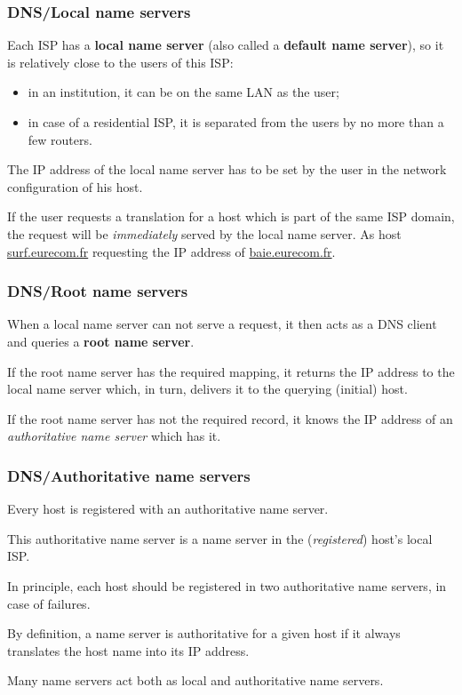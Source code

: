%
\begin{frame}
\frametitle{DNS/Local name servers}

Each ISP has a \textbf{local name server} (also called a
\textbf{default name server}), so it is relatively close to the users
of this ISP:
\begin{itemize}

  \item in an institution, it can be on the same LAN as the user;

  \item in case of a residential ISP, it is separated from the users
  by no more than a few routers.

\end{itemize}

The IP address of the local name server has to be set by the user in
the network configuration of his host.

If the user requests a translation for a host which is part of the
same ISP domain, the request will be \emph{immediately} served by the
local name server. As host \url{surf.eurecom.fr} requesting the IP
address of \url{baie.eurecom.fr}.

\end{frame}

%
\begin{frame}
\frametitle{DNS/Root name servers}

When a local name server can not serve a request, it then acts as a
DNS client and queries a \textbf{root name server}.

If the root name server has the required mapping, it returns the IP
address to the local name server which, in turn, delivers it to the
querying (initial) host.

If the root name server has not the required record, it knows the IP
address of an \emph{authoritative name server} which has it.

\end{frame}

%
\begin{frame}
\frametitle{DNS/Authoritative name
  servers}

Every host is registered with an authoritative name server.

This authoritative name server is a name server in the
(\emph{registered}) host's local ISP.

In principle, each host should be registered in two authoritative name
servers, in case of failures.

By definition, a name server is authoritative for a given host if it
always translates the host name into its IP address.

Many name servers act both as local and authoritative name servers.

\end{frame}

